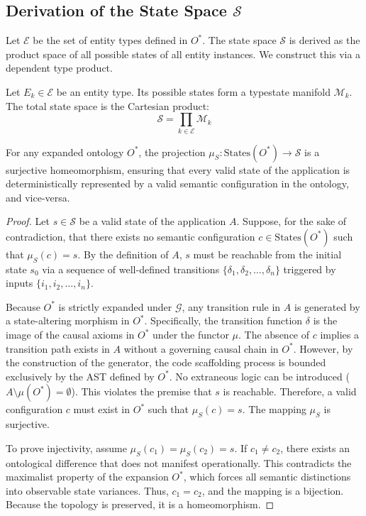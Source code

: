 \subsection{Derivation of the State Space $\mathcal{S}$}

Let $\mathcal{E}$ be the set of entity types defined in $O^*$. The state space $\mathcal{S}$ is derived as the product space of all possible states of all entity instances. We construct this via a dependent type product.

Let $E_k \in \mathcal{E}$ be an entity type. Its possible states form a typestate manifold $\mathcal{M}_k$. The total state space is the Cartesian product:
\begin{equation}
    \mathcal{S} = \prod_{k \in \mathcal{E}} \mathcal{M}_k
\end{equation}

\begin{theorem}
\label{thm:state_projection}
For any expanded ontology $O^*$, the projection $\mu_S: \text{States}(O^*) \to \mathcal{S}$ is a surjective homeomorphism, ensuring that every valid state of the application is deterministically represented by a valid semantic configuration in the ontology, and vice-versa.
\end{theorem}

\begin{proof}
Let $s \in \mathcal{S}$ be a valid state of the application $A$. Suppose, for the sake of contradiction, that there exists no semantic configuration $c \in \text{States}(O^*)$ such that $\mu_S(c) = s$. By the definition of $A$, $s$ must be reachable from the initial state $s_0$ via a sequence of well-defined transitions $\{\delta_1, \delta_2, \dots, \delta_n\}$ triggered by inputs $\{i_1, i_2, \dots, i_n\}$. 

Because $O^*$ is strictly expanded under $\mathcal{G}$, any transition rule in $A$ is generated by a state-altering morphism in $O^*$. Specifically, the transition function $\delta$ is the image of the causal axioms in $O^*$ under the functor $\mu$. The absence of $c$ implies a transition path exists in $A$ without a governing causal chain in $O^*$. However, by the construction of the generator, the code scaffolding process is bounded exclusively by the AST defined by $O^*$. No extraneous logic can be introduced ($A \setminus \mu(O^*) = \emptyset$). This violates the premise that $s$ is reachable. Therefore, a valid configuration $c$ must exist in $O^*$ such that $\mu_S(c) = s$. The mapping $\mu_S$ is surjective. 

To prove injectivity, assume $\mu_S(c_1) = \mu_S(c_2) = s$. If $c_1 \neq c_2$, there exists an ontological difference that does not manifest operationally. This contradicts the maximalist property of the expansion $O^*$, which forces all semantic distinctions into observable state variances. Thus, $c_1 = c_2$, and the mapping is a bijection. Because the topology is preserved, it is a homeomorphism.
\end{proof}

